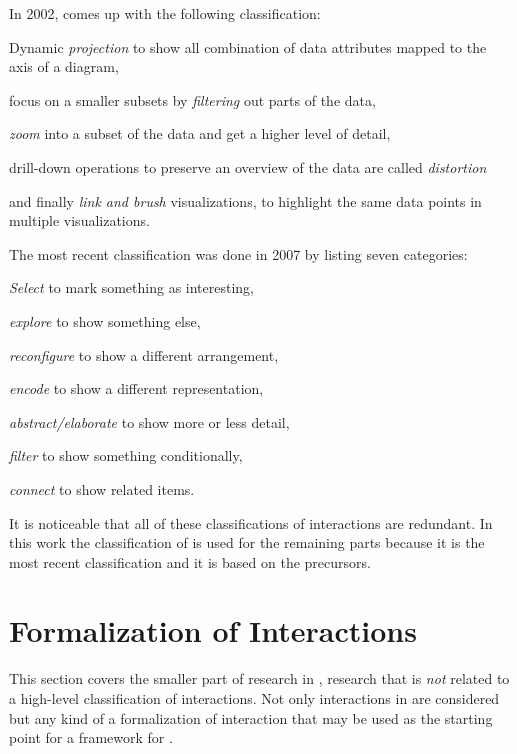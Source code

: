 In 2002, \textcite{Keim2002} comes up with the following classification:
\begin{enumerate*}[label=(\arabic*)]
  \item
    Dynamic \emph{projection} to show all combination of data attributes mapped to the axis of a diagram,
  \item
    focus on a smaller subsets by \emph{filtering} out parts of the data,
  \item
    \emph{zoom} into a subset of the data and get a higher level of detail,
  \item
     drill-down operations to preserve an overview of the data are called \emph{distortion}
  \item
    and finally \emph{link and brush} visualizations, to highlight the same data points in multiple visualizations.
\end{enumerate*}

The most recent classification was done in 2007 by \textcite{Yi2007} listing seven categories:
\begin{enumerate*}[label=(\arabic*)]
  \item
    \emph{Select} to mark something as interesting,
  \item
    \emph{explore} to show something else,
  \item
    \emph{reconfigure} to show a different arrangement,
  \item
    \emph{encode} to show a different representation,
  \item
    \emph{abstract/elaborate} to show more or less detail,
  \item
    \emph{filter} to show something conditionally,
  \item
    \emph{connect} to show related items.
\end{enumerate*}

It is noticeable that all of these classifications of interactions are redundant.
In this work the classification of \textcite{Yi2007} is used for the remaining parts because it is the most recent classification and it is based on the precursors.


\section{Formalization of Interactions}
This section covers the smaller part of research in \cmvs{}, research that is \emph{not} related to a high-level classification of interactions.
Not only interactions in \cmvs{} are considered but any kind of a formalization of interaction that may be used as the starting point for a framework for \cmvs{}.

